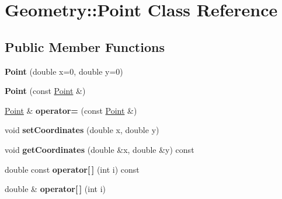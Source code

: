 \hypertarget{classGeometry_1_1Point}{\section{Geometry\-:\-:Point Class Reference}
\label{classGeometry_1_1Point}
}
\subsection*{Public Member Functions}
\begin{DoxyCompactItemize}
\item 
\hypertarget{classGeometry_1_1Point_a3624287463215de424283b6851c6f1c9}{{\bfseries Point} (double x=0, double y=0)}\label{classGeometry_1_1Point_a3624287463215de424283b6851c6f1c9}

\item 
\hypertarget{classGeometry_1_1Point_a4ef1bbf081b7dd8b6262f41b123de3b4}{{\bfseries Point} (const \hyperlink{classGeometry_1_1Point}{Point} \&)}\label{classGeometry_1_1Point_a4ef1bbf081b7dd8b6262f41b123de3b4}

\item 
\hypertarget{classGeometry_1_1Point_a6d969880cd410589bc17cafa839d62a6}{\hyperlink{classGeometry_1_1Point}{Point} \& {\bfseries operator=} (const \hyperlink{classGeometry_1_1Point}{Point} \&)}\label{classGeometry_1_1Point_a6d969880cd410589bc17cafa839d62a6}

\item 
\hypertarget{classGeometry_1_1Point_a2022bf6dda34fe0942f4c0b3381a376e}{void {\bfseries set\-Coordinates} (double x, double y)}\label{classGeometry_1_1Point_a2022bf6dda34fe0942f4c0b3381a376e}

\item 
\hypertarget{classGeometry_1_1Point_a961ba2193e60d0c513b55c3cd144dae4}{void {\bfseries get\-Coordinates} (double \&x, double \&y) const }\label{classGeometry_1_1Point_a961ba2193e60d0c513b55c3cd144dae4}

\item 
\hypertarget{classGeometry_1_1Point_a891c424b6e1f2115d18282fba8ac11ce}{double const {\bfseries operator\mbox{[}$\,$\mbox{]}} (int i) const }\label{classGeometry_1_1Point_a891c424b6e1f2115d18282fba8ac11ce}

\item 
\hypertarget{classGeometry_1_1Point_a67272b851f6199bcf33b84bbd83b39ac}{double \& {\bfseries operator\mbox{[}$\,$\mbox{]}} (int i)}\label{classGeometry_1_1Point_a67272b851f6199bcf33b84bbd83b39ac}


\end{DoxyCompactItemize}
